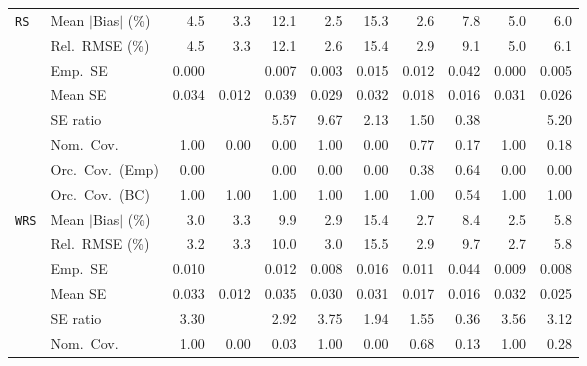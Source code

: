 \begin{landscape}
\begin{longtable}{llrrrrrrrrr}
\addlinespace[2pt]
\quad \texttt{RS} & Mean $|$Bias$|$ (\%) & 4.5 & \cellcolor{rankthree}3.3 & 12.1 & \cellcolor{rankone}2.5 & 15.3 & \cellcolor{ranktwo}2.6 & 7.8 & 5.0 & 6.0 \\
 & Rel.\ RMSE (\%) & 4.5 & \cellcolor{rankthree}3.3 & 12.1 & \cellcolor{rankone}2.6 & 15.4 & \cellcolor{ranktwo}2.9 & 9.1 & 5.0 & 6.1 \\
 & Emp.\ SE & 0.000 &  & 0.007 & 0.003 & 0.015 & 0.012 & 0.042 & 0.000 & 0.005 \\
 & Mean SE & 0.034 & 0.012 & 0.039 & 0.029 & 0.032 & 0.018 & 0.016 & 0.031 & 0.026 \\
 & SE ratio &  &  & 5.57 & 9.67 & \cellcolor{rankthree}2.13 & \cellcolor{rankone}1.50 & \cellcolor{ranktwo}0.38 &  & 5.20 \\
 & Nom.\ Cov. & \cellcolor{rankone}1.00 & 0.00 & 0.00 & \cellcolor{rankone}1.00 & 0.00 & \cellcolor{ranktwo}0.77 & 0.17 & \cellcolor{rankone}1.00 & \cellcolor{rankthree}0.18 \\
 & Orc.\ Cov.\ (Emp) & \cellcolor{rankthree}0.00 &  & \cellcolor{rankthree}0.00 & \cellcolor{rankthree}0.00 & \cellcolor{rankthree}0.00 & \cellcolor{ranktwo}0.38 & \cellcolor{rankone}0.64 & \cellcolor{rankthree}0.00 & \cellcolor{rankthree}0.00 \\
 & Orc.\ Cov.\ (BC) & \cellcolor{rankone}1.00 & \cellcolor{rankone}1.00 & \cellcolor{rankone}1.00 & \cellcolor{rankone}1.00 & \cellcolor{rankone}1.00 & \cellcolor{rankone}1.00 & \cellcolor{ranktwo}0.54 & \cellcolor{rankone}1.00 & \cellcolor{rankone}1.00 \\
\addlinespace[2pt]
\quad \texttt{WRS} & Mean $|$Bias$|$ (\%) & 3.0 & 3.3 & 9.9 & \cellcolor{rankthree}2.9 & 15.4 & \cellcolor{ranktwo}2.7 & 8.4 & \cellcolor{rankone}2.5 & 5.8 \\
 & Rel.\ RMSE (\%) & 3.2 & 3.3 & 10.0 & \cellcolor{rankthree}3.0 & 15.5 & \cellcolor{ranktwo}2.9 & 9.7 & \cellcolor{rankone}2.7 & 5.8 \\
 & Emp.\ SE & 0.010 &  & 0.012 & 0.008 & 0.016 & 0.011 & 0.044 & 0.009 & 0.008 \\
 & Mean SE & 0.033 & 0.012 & 0.035 & 0.030 & 0.031 & 0.017 & 0.016 & 0.032 & 0.025 \\
 & SE ratio & 3.30 &  & 2.92 & 3.75 & \cellcolor{rankthree}1.94 & \cellcolor{rankone}1.55 & \cellcolor{ranktwo}0.36 & 3.56 & 3.12 \\
 & Nom.\ Cov. & \cellcolor{rankone}1.00 & 0.00 & 0.03 & \cellcolor{rankone}1.00 & 0.00 & \cellcolor{ranktwo}0.68 & 0.13 & \cellcolor{rankone}1.00 & \cellcolor{rankthree}0.28 \\

\end{longtable}
\end{landscape}
